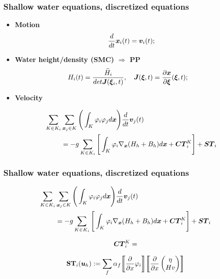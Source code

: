 \documentclass[pt12]{beamer}
\newcommand{\uapp}[0]{\uvec{u}_h}
\newcommand{\uvec}[2][3]{\boldsymbol{#2\mkern-#1mu}\mkern#1mu}
\begin{document}
\begin{frame}
\frametitle{Shallow water equations, discretized equations}

\begin{itemize}

\item \textbf{Motion}
$$\frac{d}{dt}\uvec{x}_i(t)=\uvec{v}_i(t);$$

\item \textbf{Water height/density (SMC) $\Rightarrow$ PP} 
\begin{align*}
&H_i(t)=\frac{\widehat{H}_i}{det \uvec{J}(\uvec{\xi}_i,t)}, \quad \uvec{J}(\uvec{\xi},t)=\frac{\partial \uvec{x}}{\partial \uvec{\xi}}(\uvec{\xi},t);
\end{align*}


\item \textbf{Velocity} 

\begin{align*}
\sum_{K \in K_i} & \sum_{\uvec{x}_j \in K} \Bigg(\int_K \varphi_i \varphi_j d \uvec{x}\Bigg) \frac{d}{dt}\uvec{v}_j(t)\\
&= -g \sum_{K \in K_i} \Bigg[ \int_K \varphi_i \nabla_{\uvec{x}}(H_h+B_h)  d\uvec{x}+\uvec{CT}_i^K \Bigg]+\uvec{ST}_i
\end{align*}

\end{itemize}


\end{frame}


\begin{frame}
\frametitle{Shallow water equations, discretized equations}


\begin{align*}
\sum_{K \in K_i} & \sum_{\uvec{x}_j \in K} \Bigg(\int_K \varphi_i \varphi_j d \uvec{x}\Bigg) \frac{d}{dt}\uvec{v}_j(t)\\
&= -g \sum_{K \in K_i} \Bigg[ \int_K \varphi_i \nabla_{\uvec{x}}(H_h+B_h)  d\uvec{x}+\uvec{CT}_i^K \Bigg]+\uvec{ST}_i
\end{align*}

\begin{align*}
\uvec{CT}_i^K=
\end{align*}



\begin{align*}
\textbf{ST}_i(\uapp):=\sum_{f}\alpha_f  \biggl\llbracket \frac{\partial}{\partial x} \varphi_i\biggr\rrbracket  \biggl\llbracket \frac{\partial}{\partial x} \begin{pmatrix}
\eta \\
H v
\end{pmatrix} \biggr\rrbracket
\end{align*}



\end{frame}
\end{document}
